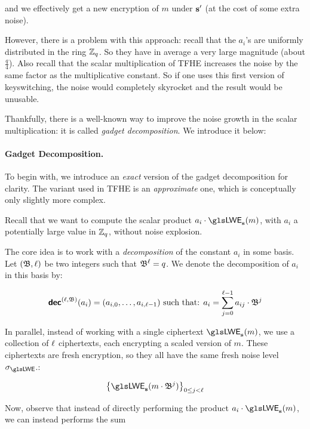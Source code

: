 \noindent
and we effectively get a new encryption of $m$ under $\mathbf s'$ (at the cost of some extra noise).


However, there is a problem with this approach: recall that the $a_i$'s are uniformly distributed in the ring $\mathbb{Z}_q$. So they have in average a very large magnitude (about $\frac q 4$). Also recall that the scalar multiplication of \gls{TFHE} increases the noise by the same factor as the multiplicative constant. So if one uses this first version of keyswitching, the noise would completely skyrocket and the result would be unusable.

Thankfully, there is a well-known way to improve the noise growth in the scalar multiplication: it is called \textit{gadget decomposition}. We introduce it below:

\paragraph{Gadget Decomposition.}

To begin with, we introduce an \textit{exact} version of the gadget decomposition for clarity. The variant used in \gls{TFHE} is an \textit{approximate} one, which is conceptually only slightly more complex.


Recall that we want to compute the scalar product $a_i \cdot \LWE_{\lweSecretKey}(m)$, with $a_i$ a potentially large value in $\mathbb{Z}_q$, without noise explosion.

The core idea is to work with a \textit{decomposition} of the constant $a_i$ in some basis. Let $(\mathfrak{B}, \ell)$ be two integers such that $\mathfrak{B}^\ell = q$. We denote the decomposition of $a_i$ in this basis by:

\[
	\textbf{\textsf{dec}}^{(\ell, \mathfrak{B})}(a_i) = (a_{i,0}, \dots, a_{i, \ell-1}) \text{ such that: } a_i = \sum_{j=0}^{\ell-1} a_{ij} \cdot \mathfrak{B}^j
\]

In parallel, instead of working with a single ciphertext $\LWE_{\lweSecretKey}(m)$, we use a collection of $\ell$ ciphertexts, each encrypting a scaled version of $m$. These ciphertexts are fresh encryption, so they all have the same fresh noise level $\lweSigma$.: 

\[
	\left \lbrace \LWE_{\lweSecretKey}(m \cdot \baseDecomp^j) \right \rbrace_{0 \le j < \levelDecomp}
\]

Now, observe that instead of directly performing the product $a_i \cdot \LWE_{\lweSecretKey}(m)$, we can instead performs the sum 

